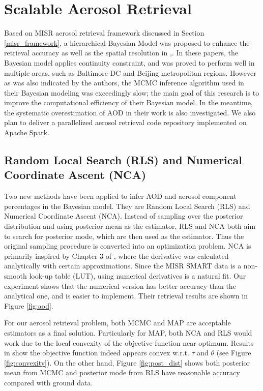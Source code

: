 \section{Scalable Aerosol Retrieval}
Based on MISR aerosol retrieval framework \cite{misr_retrieval} discussed in Section \ref{misr_framework}, a hierarchical Bayesian Model was proposed to enhance the retrieval accuracy as well as the spatial resolution in \cite{taesup},\cite{nancy_paper}. In these papers, the Bayesian model applies continuity constraint, and was proved to perform well in multiple areas, such as Baltimore-DC and Beijing metropolitan regions. However as was also indicated by the authors, the MCMC inference algorithm used in their Bayesian modeling was exceedingly slow; the main goal of this research is to improve the computational efficiency of their Bayesian model. In the meantime, the systematic overestimation of AOD in their work is also investigated. We also plan to deliver a parallelized aerosol retrieval code repository implemented on Apache Spark.

\subsection{Random Local Search (RLS) and Numerical Coordinate Ascent (NCA)}
Two new methods have been applied to infer AOD and aerosol component percentages in the Bayesian model. They are Random Local Search (RLS) and Numerical Coordinate Ascent (NCA). Instead of sampling over the posterior distribution and using posterior mean as the estimator, RLS and NCA both aim to search for posterior mode, which are then used as the estimator. Thus the original sampling procedure is converted into an optimization problem. NCA is primarily inspired by Chapter 3 of \cite{nancy_phd}, where the derivative was calculated analytically with certain approximations. Since the MISR SMART data is a non-smooth look-up table (LUT), using numerical derivatives is a natural fit. Our experiment shows that the numerical version has better accuracy than the analytical one, and is easier to implement. Their retrieval results are shown in Figure \ref{fig:aod}.

For our aerosol retrieval problem, both MCMC and MAP are acceptable estimators as a final solution. Particularly for MAP, both NCA and RLS would work due to the local convexity of the objective function near optimum. Results in \cite{nancy_phd} show the objective function indeed appears convex w.r.t. $\tau$ and $\theta$ (see Figure \ref{fig:convexity}). On the other hand, Figure \ref{fig:post_dist} shows both posterior mean from MCMC and posterior mode from RLS have reasonable accuracy compared with ground data.

